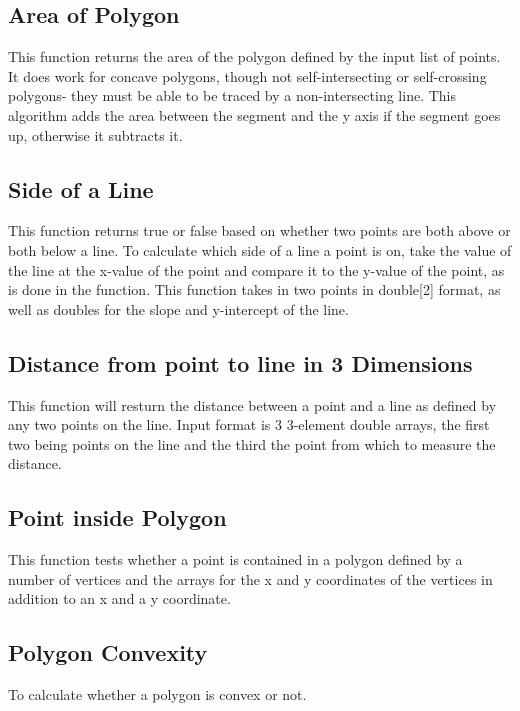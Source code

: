 \subsection{Area of Polygon}
This function returns the area of the polygon defined by the input list of points. It does work for concave polygons, though not self-intersecting or self-crossing polygons- they must be able to be traced by a non-intersecting line. This algorithm adds the area between the segment and the y axis if the segment goes up, otherwise it subtracts it.


\subsection{Side of a Line}
This function returns true or false based on whether two points are both above or both below a line. To calculate which side of a line a point is on, take the value of the line at the x-value of the point and compare it to the y-value of the point, as is done in the function. This function takes in two points in double[2] format, as well as doubles for the slope and y-intercept of the line.


\subsection{Distance from point to line in 3 Dimensions}
This function will resturn the distance between a point and a line as defined by any two points on the line. Input format is 3 3-element double arrays, the first two being points on the line and the third the point from which to measure the distance.


\subsection{Point inside Polygon}
This function tests whether a point is contained in a polygon defined by a number of vertices and the arrays for the x and y coordinates of the vertices in addition to an x and a y coordinate.


\subsection{Polygon Convexity}
To calculate whether a polygon is convex or not.

